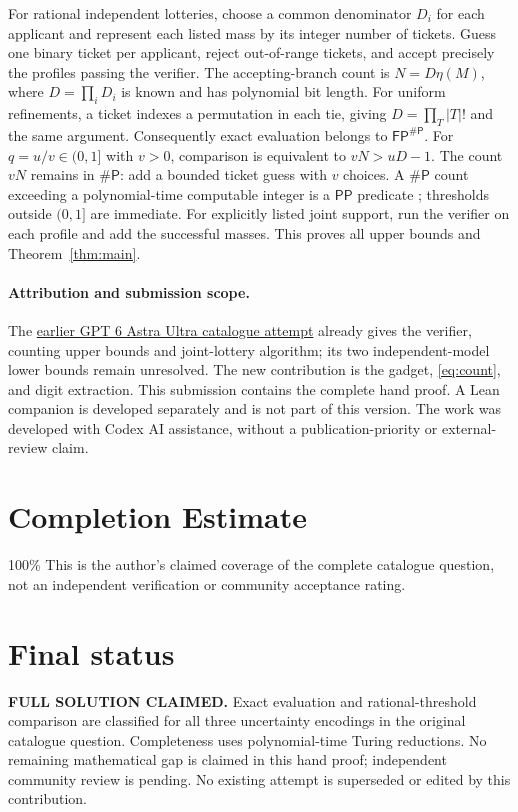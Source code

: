 \documentclass[10pt]{article}
\newcommand{\FP}{\mathsf{FP}}
\newcommand{\PP}{\mathsf{PP}}
\newcommand{\sharpP}{\mathsf{\#P}}
\begin{document}
For rational independent lotteries, choose a common denominator $D_i$
for each applicant and represent each listed mass by its integer number
of tickets. Guess one binary ticket per applicant, reject out-of-range
tickets, and accept precisely the profiles passing the verifier. The
accepting-branch count is $N=D\eta(M)$, where $D=\prod_iD_i$ is known
and has polynomial bit length. For uniform refinements, a ticket indexes
a permutation in each tie, giving $D=\prod_T|T|!$ and the same argument.
Consequently exact evaluation belongs to $\FP^{\sharpP}$. For
$q=u/v\in(0,1]$ with $v>0$, comparison is equivalent to
$vN>uD-1$. The count $vN$ remains in $\sharpP$: add a bounded ticket
guess with $v$ choices. A $\sharpP$ count exceeding a polynomial-time
computable integer is a $\PP$ predicate
\cite[Definition 2.3]{fenner}; thresholds outside $(0,1]$ are immediate.
For explicitly listed joint support,
run the verifier on each profile and add the successful masses.
This proves all upper bounds and Theorem~\ref{thm:main}.

\paragraph{Attribution and submission scope.}
The \href{https://github.com/mehmetmars7/Erdosproblems-llm-hunter/blob/00ced55ba1223fb48603e1f15028d753997ee515/attacks/open_problems/economics/gpt6_astra_ultra/C78-464.tex}{earlier GPT 6 Astra Ultra catalogue attempt}
already gives the verifier, counting upper bounds and joint-lottery
algorithm; its two independent-model lower bounds remain unresolved.
The new contribution is the gadget, \eqref{eq:count}, and digit extraction.
This submission contains the complete hand proof. A Lean companion is
developed separately and is not part of this version. The work was developed
with Codex AI assistance, without a publication-priority or external-review claim.

\clearpage
\section*{Completion Estimate}
100\%
This is the author's claimed coverage of the complete catalogue question,
not an independent verification or community acceptance rating.

\section*{Final status}
\textbf{FULL SOLUTION CLAIMED.} Exact evaluation and rational-threshold
comparison are classified for all three uncertainty encodings in the
original catalogue question. Completeness uses polynomial-time Turing
reductions. No remaining mathematical gap is claimed in this hand proof;
independent community review is pending. No existing attempt is superseded
or edited by this contribution.
\end{document}
